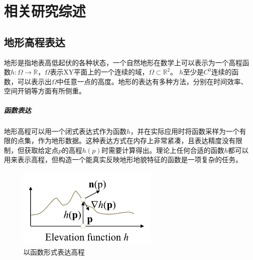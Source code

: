 
\chapter{相关研究综述}
\section{地形高程表达}
地形是指地表高低起伏的各种状态，一个自然地形在数学上可以表示为一个高程函数$h:\Omega\to\mathbb{R}$，$\Omega$表示XY平面上的一个连续的域，$\Omega \subset \mathbb{R}^2$。 $h$至少是$C^0$连续的函数，可以表示出$\Omega$中任意一点的高度。地形的表达有多种方法，分别在时间效率、空间开销等方面有所侧重。
\paragraph{函数表达}地形高程可以用一个闭式表达式作为函数$h$，并在实际应用时将函数采样为一个有限的点集，作为地形数据\supercite{CignoniRepresentation}。这种表达方式在内存上非常紧凑，且表达精度没有限制，但获取给定点$p$的高程$h(p)$时需要计算得出。理论上任何合适的函数$h$都可以用来表示高程，但构造一个能真实反映地形地貌特征的函数是一项复杂的任务。
\begin{figure}[htbp]
\centering
\includegraphics[height=4cm,width=6.9cm]{figures/continue.PNG}
\caption{以函数形式表达高程\supercite{eric-review}}
\end{figure}
